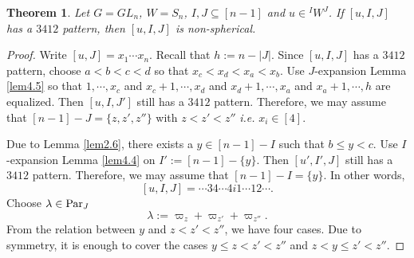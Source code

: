 \documentclass[12pt]{amsart}
\newtheorem{theorem}{Theorem}[section]
\theoremstyle{definition}
\theoremstyle{remark}
\newcommand{\Parj}{{\rm Par}_J}
\begin{document}
\begin{theorem}\label{thm5.1}
Let $G= GL_n$, $W=S_n$, $I, J \subseteq [n-1]$ and $u \in {}^I W^J$. If $[u,I,J]$ has a $3412$ pattern, then $[u,I,J]$ is non-spherical.
\end{theorem}
\begin{proof}
Write $[u,J] = x_1 \cdots x_n$. Recall that $h:=n - |J|$. Since $[u,I,J]$ has a $3412$ pattern, choose $a < b< c <d$ so that $x_c < x_d <x_a < x_b$. Use $J$-expansion Lemma \ref{lem4.5} so that $1 , \cdots , x_c$ and $x_c +1 , \cdots , x_d$ and $x_d +1 , \cdots ,x_a$ and $x_a+1 , \cdots , h$ are equalized. Then $[u,I,J']$ still has a $3412$ pattern. Therefore, we may assume that $[n-1]-J = \{ z, z', z''\}$ with $z<z'<z''$ \textit{i.e.} $x_i \in [4]$.

Due to Lemma \ref{lem2.6}, there exists a $y \in [n-1]-I$ such that $b \leq y < c$. Use $I$-expansion Lemma \ref{lem4.4} on $I' := [n-1]-\{y\}$. Then $[u',I',J]$ still has a $3412$ pattern. Therefore, we may assume that $[n-1]-I = \{y\}$. In other words,
\begin{equation}\label{eqn5.1}
[u,I,J] =  \cdots 3 4 \cdots 4 i 1\cdots 12 \cdots .
\end{equation}
Choose $\lambda \in \Parj$
\begin{equation}\label{eqn5.2}
\lambda := \varpi_z + \varpi_{z'} + \varpi_{z''}.
\end{equation}
From the relation between $y$ and $z<z'<z''$, we have four cases. Due to symmetry, it is enough to cover the cases $y\leq z < z' <z''$ and $z < y \leq z' < z''$. 


\end{proof}
\end{document}
